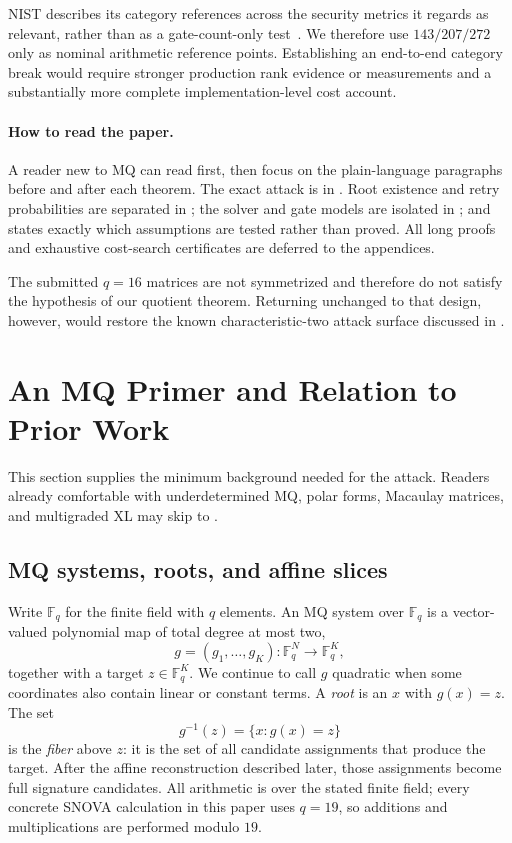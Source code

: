 \documentclass[11pt]{article}
\newcommand{\F}{\mathbb F}
\newcommand{\SNOVA}{\textsf{SNOVA}}
\begin{document}
NIST describes its category references across the security metrics it regards
as relevant, rather than as a gate-count-only test~\cite{NISTPQCCriteria}.  We
therefore use $143/207/272$ only as nominal arithmetic reference points.
Establishing an end-to-end category break would require stronger production
rank evidence or measurements and a substantially more complete
implementation-level cost account.

\paragraph{How to read the paper.}
A reader new to MQ can read  first, then focus on the
plain-language paragraphs before and after each theorem.  The exact attack is
in .  Root existence and
retry probabilities are separated in ; the solver and gate
models are isolated in ; and
 states exactly which assumptions are tested rather than
proved.  All long proofs and exhaustive cost-search certificates are deferred
to the appendices.

The submitted $q=16$ matrices are not symmetrized and therefore do not satisfy
the hypothesis of our quotient theorem.  Returning unchanged to that design,
however, would restore the known characteristic-two attack surface discussed
in .

\section{An MQ Primer and Relation to Prior Work}\label{sec:mq-background}

This section supplies the minimum background needed for the attack.  Readers
already comfortable with underdetermined MQ, polar forms, Macaulay matrices,
and multigraded XL may skip to .

\subsection{MQ systems, roots, and affine slices}\label{sec:mq-primer}

Write $\F_q$ for the finite field with $q$ elements.  An MQ system over
$\F_q$ is a vector-valued polynomial map of total degree at most two,
\[
  g=(g_1,\ldots,g_K):\F_q^N\longrightarrow\F_q^K,
\]
together with a target $z\in\F_q^K$.  We continue to call $g$ quadratic when
some coordinates also contain linear or constant terms.  A \emph{root} is an
$x$ with $g(x)=z$.
The set
\[
  g^{-1}(z)=\{x:g(x)=z\}
\]
is the \emph{fiber} above $z$: it is the set of all candidate assignments
that produce the target.  After the affine reconstruction described later,
those assignments become full signature candidates.  All arithmetic is over
the stated finite field; every concrete \SNOVA{} calculation in this paper uses
$q=19$, so additions and multiplications are performed modulo $19$.
\end{document}
